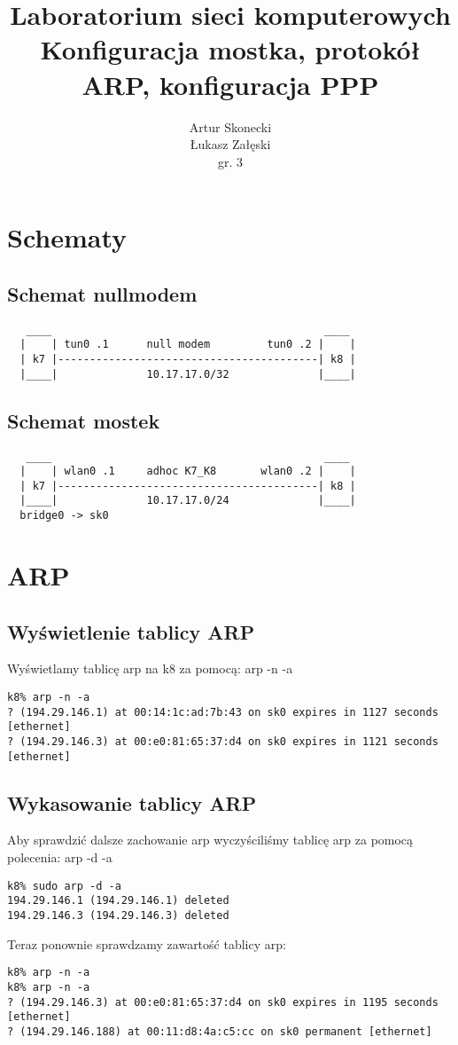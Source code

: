 \documentclass[a4paper,11pt,notitlepage]{article}
\title{\textbf{Laboratorium sieci komputerowych\\Konfiguracja mostka, protokół ARP, konfiguracja PPP}}
\author{Artur Skonecki\\Łukasz Załęski\\gr. 3}
\begin{document}
\maketitle

\section{Schematy}

\subsection{Schemat nullmodem}
\begin{verbatim}
   ____                                           ____
  |    | tun0 .1      null modem         tun0 .2 |    |
  | k7 |-----------------------------------------| k8 |
  |____|              10.17.17.0/32              |____|
\end{verbatim}
\subsection{Schemat mostek}
\begin{verbatim}
   ____                                           ____
  |    | wlan0 .1     adhoc K7_K8       wlan0 .2 |    |
  | k7 |-----------------------------------------| k8 |
  |____|              10.17.17.0/24              |____|
  bridge0 -> sk0
\end{verbatim}

\section{ARP}
\subsection{Wyświetlenie tablicy ARP}
Wyświetlamy tablicę arp na k8 za pomocą: arp -n -a
\begin{verbatim}
k8% arp -n -a
? (194.29.146.1) at 00:14:1c:ad:7b:43 on sk0 expires in 1127 seconds [ethernet]
? (194.29.146.3) at 00:e0:81:65:37:d4 on sk0 expires in 1121 seconds [ethernet]
\end{verbatim}
\subsection{Wykasowanie tablicy ARP}
Aby sprawdzić dalsze zachowanie arp wyczyściliśmy tablicę arp za pomocą 
polecenia: arp -d -a
\begin{verbatim}
k8% sudo arp -d -a
194.29.146.1 (194.29.146.1) deleted
194.29.146.3 (194.29.146.3) deleted
\end{verbatim}
Teraz ponownie sprawdzamy zawartość tablicy arp:
\begin{verbatim}
k8% arp -n -a
k8% arp -n -a
? (194.29.146.3) at 00:e0:81:65:37:d4 on sk0 expires in 1195 seconds 
[ethernet]
? (194.29.146.188) at 00:11:d8:4a:c5:cc on sk0 permanent [ethernet]
\end{verbatim}
\end{document}
